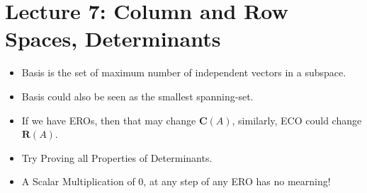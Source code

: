 \documentclass{article}
\begin{document}
\section{Lecture 7: Column and Row Spaces, Determinants}

  \begin{itemize}
    \item Basis is the set of maximum number of independent vectors in a subspace.
    \item Basis could also be seen as the smallest spanning-set.
    \item If we have EROs, then that may change $\mathbf{C}(A)$, similarly, ECO could change $\mathbf{R}(A)$.
    \item Try Proving all Properties of Determinants.
    \item A Scalar Multiplication of 0, at any step of any ERO has no mearning!
  \end{itemize}
\end{document}
